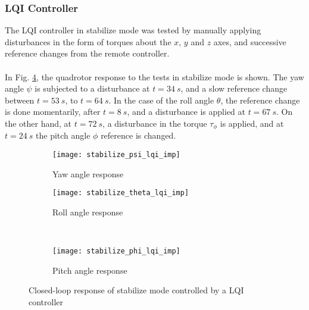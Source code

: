 \subsubsection{LQI Controller}
The LQI controller in stabilize mode was tested by manually applying disturbances in the form of torques about the $x$, $y$ and $z$ axes, and successive reference changes from the remote controller.
\\\\
In Fig. \ref{fig:stabilize_lqi_imp}, the quadrotor response to the tests in stabilize mode is shown. The yaw angle $\psi$ is subjected to a disturbance at $t = 34\ s$, and a slow reference change between $t = 53\ s$, to $t = 64\ s$. In the case of the roll angle $\theta$, the reference change is done momentarily, after $t = 8\ s$, and a disturbance is applied at $t = 67\ s$. On the other hand, at $t = 72\ s$, a disturbance in the torque $\tau_\phi$ is applied, and at $t = 24\ s$ the pitch angle $\phi$ reference is changed.
\begin{figure}[H]
\begin{subfigure}{.5\linewidth}
\centering
\texttt{[image: stabilize\_psi\_lqi\_imp]}
\caption{Yaw angle response}
\label{fig:stabilize_psi_lqi_imp}
\end{subfigure}%
\begin{subfigure}{.5\linewidth}
\centering
\texttt{[image: stabilize\_theta\_lqi\_imp]}
\caption{Roll angle response}
\label{fig:stabilize_theta_lqi_imp}
\end{subfigure}\\[1ex]
\begin{subfigure}{\linewidth}
\centering
\texttt{[image: stabilize\_phi\_lqi\_imp]}
\caption{Pitch angle response}
\label{fig:stabilize_psi_lqi_imp}
\end{subfigure}
\caption{Closed-loop response of stabilize mode controlled by a LQI controller}
\label{fig:stabilize_lqi_imp}
\end{figure}
